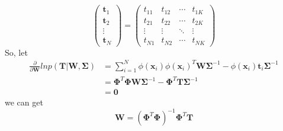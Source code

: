 \documentclass[12pt, a4paper]{article}
\begin{document}
\begin{itemize}
\begin{equation*}
\begin{pmatrix}
                \bm{t}_1\\
                \bm{t}_2\\
                \vdots\\
                \bm{t}_N
            \end{pmatrix}=\begin{pmatrix}
                t_{11} & t_{12} & \cdots & t_{1K}\\
                t_{21} & t_{22} & \cdots & t_{2K}\\
                \vdots & \vdots & \ddots & \vdots\\
                t_{N1} & t_{N2} & \cdots & t_{NK}
            \end{pmatrix}
        \end{equation*}
        So, let
        \begin{align}
            \frac{\partial}{\partial{\bm{W}}}lnp(\bm{T}|\bm{W},\bm{\Sigma})&=\sum_{i=1}^N\phi(\bm{x}_i)
            \phi(\bm{x}_i)^T\bm{W}\bm{\Sigma}^{-1}-\phi(\bm{x}_i)\bm{t}_i\bm{\Sigma}^{-1}\nonumber\\
            &=\bm{\Phi}^T\bm{\Phi}\bm{W}\bm{\Sigma}^{-1}-\bm{\Phi}^T\bm{T}\bm{\Sigma}^{-1}\nonumber\\
            &=\bm{0}
        \end{align}
        we can get
        \begin{equation*}
            \bm{W}=(\bm{\Phi}^T\bm{\Phi})^{-1}\bm{\Phi}^T\bm{T}
        \end{equation*}
    \end{itemize}
\end{document}
